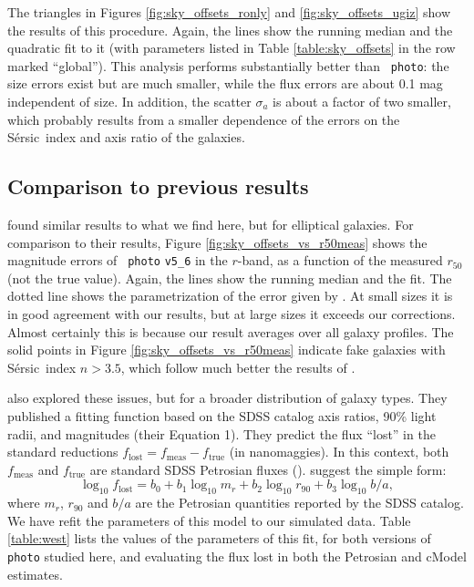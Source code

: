 \documentclass[10pt,preprint]{aastex}
\newcommand{\Sersic}{S\'ersic}
\begin{document}
The triangles in Figures \ref{fig:sky_offsets_ronly} and
\ref{fig:sky_offsets_ugiz} show the results of this procedure. Again,
the lines show the running median and the quadratic fit to it (with
parameters listed in Table \ref{table:sky_offsets} in the row marked
``global''). This analysis performs substantially better than {\tt
  photo}: the size errors exist but are much smaller, while the flux
errors are about 0.1 mag independent of size. In addition, the scatter
$\sigma_a$ is about a factor of two smaller, which probably results
from a smaller dependence of the errors on the \Sersic\ index and axis
ratio of the galaxies.

\subsection{Comparison to previous results}
\label{sec:comparison}

\citet{hyde09a} found similar results to what we find here, but for
elliptical galaxies. For comparison to their results, Figure
\ref{fig:sky_offsets_vs_r50meas} shows the magnitude errors of {\tt
  photo} {\tt v5\_6} in the $r$-band, as a function of the measured
$r_{50}$ (not the true value).  Again, the lines show the running
median and the fit. The dotted line shows the parametrization of the
error given by \citet{hyde09a}. At small sizes it is in good agreement
with our results, but at large sizes it exceeds our corrections.
Almost certainly this is because our result averages over all galaxy
profiles. The solid points in Figure \ref{fig:sky_offsets_vs_r50meas}
indicate fake galaxies with \Sersic\ index $n>3.5$, which follow much
better the results of \citet{hyde09a}.

\citet{west10a} also explored these issues, but for a broader
distribution of galaxy types.  They published a fitting function based
on the SDSS catalog axis ratios, 90\% light radii, and magnitudes
(their Equation 1). They predict the flux ``lost'' in the standard
reductions $f_{\mathrm{lost}} = f_{\mathrm{meas}} - f_{\mathrm{true}}$
(in nanomaggies). In this context, both $f_{\mathrm{meas}}$ and
$f_{\mathrm{true}}$ are standard SDSS Petrosian fluxes
(\citealt{blanton01a, stoughton02a}).  \citet{west10a} suggest the
simple form:
\begin{equation}
\label{eq:west}
\log_{10} f_{\mathrm{lost}} = 
b_0 + 
b_1 \log_{10} m_r + 
b_2 \log_{10} r_{90} + 
b_3 \log_{10} b/a,
\end{equation}
where $m_r$, $r_{90}$ and $b/a$ are the Petrosian quantities reported
by the SDSS catalog. We have refit the parameters of this model to our
simulated data.  Table \ref{table:west} lists the values of the
parameters of this fit, for both versions of {\tt photo} studied here,
and evaluating the flux lost in both the Petrosian and cModel
estimates.
\end{document}
